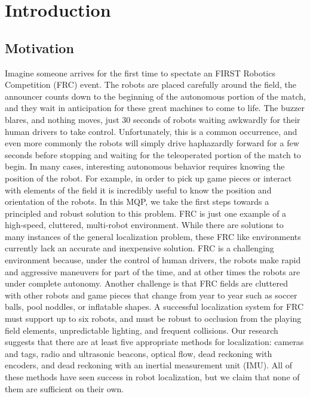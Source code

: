 \documentclass{article}
\begin{document}
\section{Introduction}

  \subsection{Motivation}

    Imagine someone arrives for the first time to spectate an FIRST Robotics Competition (FRC) event. The robots are placed carefully around the field, the announcer counts down to the beginning of the autonomous portion of the match, and they wait in anticipation for these great machines to come to life. The buzzer blares, and nothing moves, just 30 seconds of robots waiting awkwardly for their human drivers to take control. Unfortunately, this is a common occurrence, and even more commonly the robots will simply drive haphazardly forward for a few seconds before stopping and waiting for the teleoperated portion of the match to begin. In many cases, interesting autonomous behavior requires knowing the position of the robot. For example, in order to pick up game pieces or interact with elements of the field it is incredibly useful to know the position and orientation of the robots. In this MQP, we take the first steps towards a principled and robust solution to this problem. FRC is just one example of a high-speed, cluttered, multi-robot environment. While there are solutions to many instances of the general localization problem, these FRC like environments currently lack an accurate and inexpensive solution. FRC is a challenging environment because, under the control of human drivers, the robots make rapid and aggressive maneuvers for part of the time, and at other times the robots are under complete autonomy. Another challenge is that FRC fields are cluttered with other robots and game pieces that change from year to year such as soccer balls, pool noddles, or inflatable shapes. A successful localization system for FRC must support up to six robots, and must be robust to occlusion from the playing field elements, unpredictable lighting, and frequent collisions. Our research suggests that there are at least five appropriate methods for localization: cameras and tags, radio and ultrasonic beacons, optical flow, dead reckoning with encoders, and dead reckoning with an inertial measurement unit (IMU). All of these methods have seen success in robot localization, but we claim that none of them are sufficient on their own.
\end{document}
